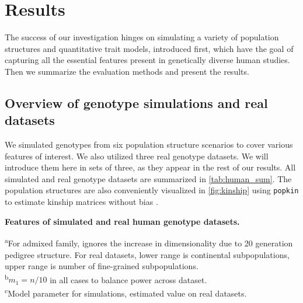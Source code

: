 \documentclass[11pt]{article}
\begin{document}
\section{Results}

The success of our investigation hinges on simulating a variety of population structures and quantitative trait models, introduced first, which have the goal of capturing all the essential features present in genetically diverse human studies.
Then we summarize the evaluation methods and present the results.

\subsection{Overview of genotype simulations and real datasets}

We simulated genotypes from six population structure scenarios to cover various features of interest.
We also utilized three real genotype datasets.
We will introduce them here in sets of three, as they appear in the rest of our results.
All simulated and real genotype datasets are summarized in \cref{tab:human_sum}.
The population structures are also conveniently visualized in \cref{fig:kinship} using \texttt{popkin} to estimate kinship matrices without bias \citep{ochoa_estimating_2021}.

\begin{table}[hb!]
  \centering
  \footnotesize
  \caption{
    \textbf{Features of simulated and real human genotype datasets.}
  }
  \label{tab:human_sum}
  \begin{flushleft} 
    \textsuperscript{a}For admixed family, ignores the increase in dimensionality due to 20 generation pedigree structure.
    For real datasets, lower range is continental subpopulations, upper range is number of fine-grained subpopulations.\\
    \textsuperscript{b}$m_1 = n / 10$ in all cases to balance power across dataset.\\
    \textsuperscript{c}Model parameter for simulations, estimated value on real datasets.
  \end{flushleft}
\end{table}
\end{document}
